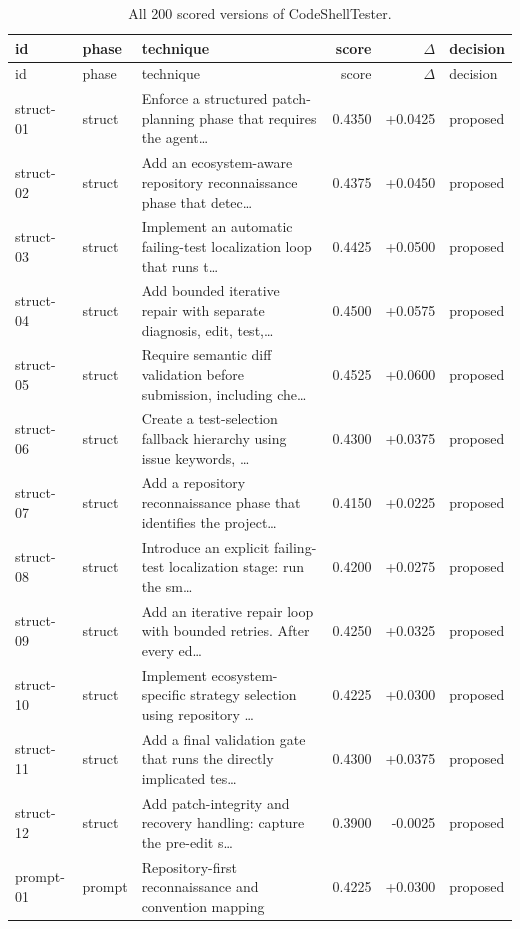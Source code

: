 \begin{center}\scriptsize\begin{longtable}{llp{5.2cm}rrl}
\caption{All 200 scored versions of CodeShellTester.}\\
\toprule id & phase & technique & score & $\Delta$ & decision \\ \midrule \endfirsthead
\toprule id & phase & technique & score & $\Delta$ & decision \\ \midrule \endhead
struct-01 & struct & Enforce a structured patch-planning phase that requires the agent\ldots{} & 0.4350 & +0.0425 & proposed \\
struct-02 & struct & Add an ecosystem-aware repository reconnaissance phase that detec\ldots{} & 0.4375 & +0.0450 & proposed \\
struct-03 & struct & Implement an automatic failing-test localization loop that runs t\ldots{} & 0.4425 & +0.0500 & proposed \\
struct-04 & struct & Add bounded iterative repair with separate diagnosis, edit, test,\ldots{} & 0.4500 & +0.0575 & proposed \\
struct-05 & struct & Require semantic diff validation before submission, including che\ldots{} & 0.4525 & +0.0600 & proposed \\
struct-06 & struct & Create a test-selection fallback hierarchy using issue keywords, \ldots{} & 0.4300 & +0.0375 & proposed \\
struct-07 & struct & Add a repository reconnaissance phase that identifies the project\ldots{} & 0.4150 & +0.0225 & proposed \\
struct-08 & struct & Introduce an explicit failing-test localization stage: run the sm\ldots{} & 0.4200 & +0.0275 & proposed \\
struct-09 & struct & Add an iterative repair loop with bounded retries. After every ed\ldots{} & 0.4250 & +0.0325 & proposed \\
struct-10 & struct & Implement ecosystem-specific strategy selection using repository \ldots{} & 0.4225 & +0.0300 & proposed \\
struct-11 & struct & Add a final validation gate that runs the directly implicated tes\ldots{} & 0.4300 & +0.0375 & proposed \\
struct-12 & struct & Add patch-integrity and recovery handling: capture the pre-edit s\ldots{} & 0.3900 & -0.0025 & proposed \\
prompt-01 & prompt & Repository-first reconnaissance and convention mapping & 0.4225 & +0.0300 & proposed \\

\end{longtable}
\end{center}
